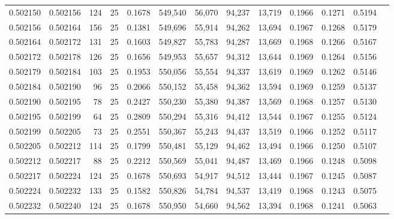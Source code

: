 \begin{tabular}{rrrrrrrrrrrrr}
0.502150 & 0.502156 & 124 &  25 &                                     0.1678 & 549,540 &  56,070 &  94,237 &  13,719 & 0.1966 & 0.1271 & 0.5194 \\
0.502156 & 0.502164 & 156 &  25 &                                     0.1381 & 549,696 &  55,914 &  94,262 &  13,694 & 0.1967 & 0.1268 & 0.5179 \\
0.502164 & 0.502172 & 131 &  25 &                                     0.1603 & 549,827 &  55,783 &  94,287 &  13,669 & 0.1968 & 0.1266 & 0.5167 \\
0.502172 & 0.502178 & 126 &  25 &                                     0.1656 & 549,953 &  55,657 &  94,312 &  13,644 & 0.1969 & 0.1264 & 0.5156 \\
0.502179 & 0.502184 & 103 &  25 &                                     0.1953 & 550,056 &  55,554 &  94,337 &  13,619 & 0.1969 & 0.1262 & 0.5146 \\
0.502184 & 0.502190 &  96 &  25 &                                     0.2066 & 550,152 &  55,458 &  94,362 &  13,594 & 0.1969 & 0.1259 & 0.5137 \\
0.502190 & 0.502195 &  78 &  25 &                                     0.2427 & 550,230 &  55,380 &  94,387 &  13,569 & 0.1968 & 0.1257 & 0.5130 \\
0.502195 & 0.502199 &  64 &  25 &                                     0.2809 & 550,294 &  55,316 &  94,412 &  13,544 & 0.1967 & 0.1255 & 0.5124 \\
0.502199 & 0.502205 &  73 &  25 &                                     0.2551 & 550,367 &  55,243 &  94,437 &  13,519 & 0.1966 & 0.1252 & 0.5117 \\
0.502205 & 0.502212 & 114 &  25 &                                     0.1799 & 550,481 &  55,129 &  94,462 &  13,494 & 0.1966 & 0.1250 & 0.5107 \\
0.502212 & 0.502217 &  88 &  25 &                                     0.2212 & 550,569 &  55,041 &  94,487 &  13,469 & 0.1966 & 0.1248 & 0.5098 \\
0.502217 & 0.502224 & 124 &  25 &                                     0.1678 & 550,693 &  54,917 &  94,512 &  13,444 & 0.1967 & 0.1245 & 0.5087 \\
0.502224 & 0.502232 & 133 &  25 &                                     0.1582 & 550,826 &  54,784 &  94,537 &  13,419 & 0.1968 & 0.1243 & 0.5075 \\
0.502232 & 0.502240 & 124 &  25 &                                     0.1678 & 550,950 &  54,660 &  94,562 &  13,394 & 0.1968 & 0.1241 & 0.5063 \\

\end{tabular}
